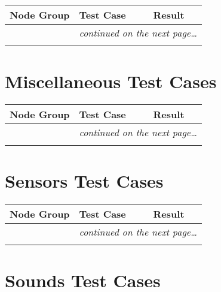 \documentclass[12pt,letterpaper]{article}
\newcounter{testCaseCtr}
\newcommand{\resetTestCase}{\setcounter{testCaseCtr}{1}}
\begin{document}
\begin{center}
\setlongtables
\begin{longtable}{|l|l|l|}
\hline
\textbf{Node Group} & \textbf{Test Case} & \textbf{Result} \\
\hline\hline
\endhead
\cline{2-3}
 & \multicolumn{2}{|r|}{\textsl{continued on the next page\ldots}} \\
\hline
\endfoot
\hline
\endlastfoot
& & \\
\cline{2-3}
\end{longtable}
\end{center}

\section{Miscellaneous Test Cases}
\resetTestCase

\begin{center}
\setlongtables
\begin{longtable}{|l|l|l|}
\hline
\textbf{Node Group} & \textbf{Test Case} & \textbf{Result} \\
\hline\hline
\endhead
\cline{2-3}
 & \multicolumn{2}{|r|}{\textsl{continued on the next page\ldots}} \\
\hline
\endfoot
\hline
\endlastfoot
& & \\
\cline{2-3}
\end{longtable}
\end{center}

\section{Sensors Test Cases}
\resetTestCase

\begin{center}
\setlongtables
\begin{longtable}{|l|l|l|}
\hline
\textbf{Node Group} & \textbf{Test Case} & \textbf{Result} \\
\hline\hline
\endhead
\cline{2-3}
 & \multicolumn{2}{|r|}{\textsl{continued on the next page\ldots}} \\
\hline
\endfoot
\hline
\endlastfoot
& & \\
\cline{2-3}
\end{longtable}
\end{center}

\section{Sounds Test Cases}
\resetTestCase
\end{document}

